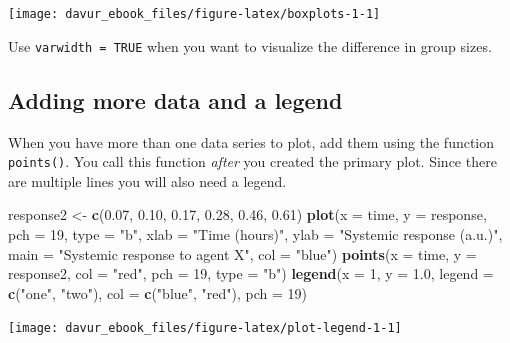 \documentclass[]{book}
\newenvironment{Shaded}{\begin{snugshade}}{\end{snugshade}}
\newcommand{\DataTypeTok}[1]{\textcolor[rgb]{0.13,0.29,0.53}{#1}}
\newcommand{\DecValTok}[1]{\textcolor[rgb]{0.00,0.00,0.81}{#1}}
\newcommand{\FloatTok}[1]{\textcolor[rgb]{0.00,0.00,0.81}{#1}}
\newcommand{\KeywordTok}[1]{\textcolor[rgb]{0.13,0.29,0.53}{\textbf{#1}}}
\newcommand{\NormalTok}[1]{#1}
\newcommand{\StringTok}[1]{\textcolor[rgb]{0.31,0.60,0.02}{#1}}
\begin{document}
\begin{center}\texttt{[image: davur\_ebook\_files/figure-latex/boxplots-1-1]} \end{center}

Use \texttt{varwidth\ =\ TRUE} when you want to visualize the difference in group sizes.

\hypertarget{adding-more-data-and-a-legend}{%
\subsection{Adding more data and a legend}\label{adding-more-data-and-a-legend}}

When you have more than one data series to plot, add them using the function \texttt{points()}. You call this function \emph{after} you created the primary plot. Since there are multiple lines you will also need a legend.

\begin{Shaded}
\begin{Highlighting}[]
\NormalTok{response2 <-}\StringTok{ }\KeywordTok{c}\NormalTok{(}\FloatTok{0.07}\NormalTok{, }\FloatTok{0.10}\NormalTok{, }\FloatTok{0.17}\NormalTok{, }\FloatTok{0.28}\NormalTok{, }\FloatTok{0.46}\NormalTok{, }\FloatTok{0.61}\NormalTok{)}
\KeywordTok{plot}\NormalTok{(}\DataTypeTok{x =}\NormalTok{ time, }\DataTypeTok{y =}\NormalTok{ response, }\DataTypeTok{pch =} \DecValTok{19}\NormalTok{, }\DataTypeTok{type =} \StringTok{"b"}\NormalTok{,}
     \DataTypeTok{xlab =} \StringTok{"Time (hours)"}\NormalTok{, }\DataTypeTok{ylab =} \StringTok{"Systemic response (a.u.)"}\NormalTok{,}
     \DataTypeTok{main =} \StringTok{"Systemic response to agent X"}\NormalTok{, }\DataTypeTok{col =} \StringTok{"blue"}\NormalTok{)}
\KeywordTok{points}\NormalTok{(}\DataTypeTok{x =}\NormalTok{ time, }\DataTypeTok{y =}\NormalTok{ response2, }\DataTypeTok{col =} \StringTok{"red"}\NormalTok{, }\DataTypeTok{pch =} \DecValTok{19}\NormalTok{, }\DataTypeTok{type =} \StringTok{"b"}\NormalTok{)}
\KeywordTok{legend}\NormalTok{(}\DataTypeTok{x =} \DecValTok{1}\NormalTok{, }\DataTypeTok{y =} \FloatTok{1.0}\NormalTok{, }\DataTypeTok{legend =} \KeywordTok{c}\NormalTok{(}\StringTok{"one"}\NormalTok{, }\StringTok{"two"}\NormalTok{), }\DataTypeTok{col =} \KeywordTok{c}\NormalTok{(}\StringTok{"blue"}\NormalTok{, }\StringTok{"red"}\NormalTok{), }\DataTypeTok{pch =} \DecValTok{19}\NormalTok{)}
\end{Highlighting}
\end{Shaded}

\begin{center}\texttt{[image: davur\_ebook\_files/figure-latex/plot-legend-1-1]} \end{center}
\end{document}
